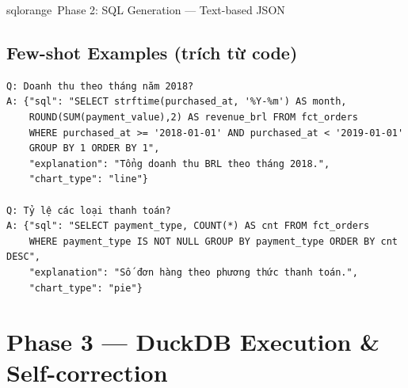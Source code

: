 \documentclass[12pt, a4paper]{article}
\begin{document}
\begin{phasebox}{sqlorange}{\faBolt\ Phase 2: SQL Generation — Text-based JSON}
\subsection*{Few-shot Examples (trích từ code)}

\begin{codebox}[title={Ví dụ few-shot trong system prompt}]
\begin{verbatim}
Q: Doanh thu theo tháng năm 2018?
A: {"sql": "SELECT strftime(purchased_at, '%Y-%m') AS month,
    ROUND(SUM(payment_value),2) AS revenue_brl FROM fct_orders
    WHERE purchased_at >= '2018-01-01' AND purchased_at < '2019-01-01'
    GROUP BY 1 ORDER BY 1",
    "explanation": "Tổng doanh thu BRL theo tháng 2018.",
    "chart_type": "line"}

Q: Tỷ lệ các loại thanh toán?
A: {"sql": "SELECT payment_type, COUNT(*) AS cnt FROM fct_orders
    WHERE payment_type IS NOT NULL GROUP BY payment_type ORDER BY cnt DESC",
    "explanation": "Số đơn hàng theo phương thức thanh toán.",
    "chart_type": "pie"}
\end{verbatim}
\end{codebox}

\end{phasebox}

\newpage

\section{Phase 3 — DuckDB Execution \& Self-correction}
\end{document}

